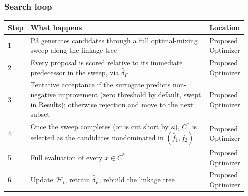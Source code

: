 \subsubsection*{Search loop}
\begin{longtable}{p{0.06\linewidth} p{0.79\linewidth} p{0.10\linewidth}}
\toprule
\textbf{Step} & \textbf{What happens} & \textbf{Location} \\
\midrule
\endhead
1 & P3 generates candidates through a full optimal-mixing sweep along the linkage tree & Proposed Optimizer \\
2 & Every proposal is scored relative to its immediate predecessor in the sweep, via $\hat\delta_F$ & Proposed Optimizer \\
3 & Tentative acceptance if the surrogate predicts non-negative improvement (zero threshold by default, swept in Results); otherwise rejection and move to the next subset & Proposed Optimizer \\
4 & Once the sweep completes (or is cut short by $\kappa$), $C^*$ is selected as the candidates nondominated in $(\hat f_1, f_2)$ & Proposed Optimizer \\
5 & Full evaluation of every $x\in C^*$ & Proposed Optimizer \\
6 & Update $\mathcal{H}_t$, retrain $\hat\delta_F$, rebuild the linkage tree & Proposed Optimizer \\
\bottomrule
\end{longtable}

